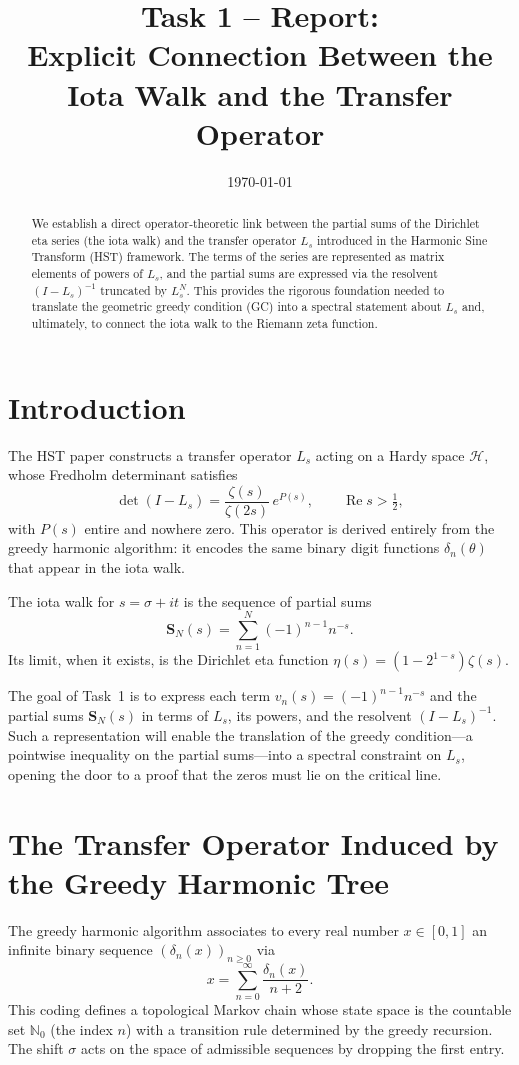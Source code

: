 \documentclass[11pt,a4paper]{article}
\title{\bf Task 1 -- Report: \\
Explicit Connection Between the Iota Walk and the Transfer Operator}
\author{}
\date{\today}
\newcommand{\N}{\mathbb{N}}
\newcommand{\RE}{\operatorname{Re}}
\begin{document}
\maketitle

\begin{abstract}
We establish a direct operator‑theoretic link between the partial sums of the Dirichlet eta series (the iota walk) and the transfer operator $L_s$ introduced in the Harmonic Sine Transform (HST) framework.  The terms of the series are represented as matrix elements of powers of $L_s$, and the partial sums are expressed via the resolvent $(I-L_s)^{-1}$ truncated by $L_s^N$.  This provides the rigorous foundation needed to translate the geometric greedy condition (GC) into a spectral statement about $L_s$ and, ultimately, to connect the iota walk to the Riemann zeta function.
\end{abstract}

\section{Introduction}
The HST paper \cite{HST} constructs a transfer operator $L_s$ acting on a Hardy space $\mathcal{H}$, whose Fredholm determinant satisfies
\[
\det(I - L_s) = \frac{\zeta(s)}{\zeta(2s)}\, e^{P(s)}, \qquad \RE s > \tfrac12,
\tag{1}
\]
with $P(s)$ entire and nowhere zero.  This operator is derived entirely from the greedy harmonic algorithm: it encodes the same binary digit functions $\delta_n(\theta)$ that appear in the iota walk.

The iota walk for $s = \sigma + it$ is the sequence of partial sums
\[
\mathbf{S}_N(s) = \sum_{n=1}^{N} (-1)^{n-1} n^{-s}.
\]
Its limit, when it exists, is the Dirichlet eta function $\eta(s) = (1-2^{1-s})\zeta(s)$.

The goal of Task~1 is to express each term $v_n(s) = (-1)^{n-1} n^{-s}$ and the partial sums $\mathbf{S}_N(s)$ in terms of $L_s$, its powers, and the resolvent $(I-L_s)^{-1}$.  Such a representation will enable the translation of the greedy condition—a pointwise inequality on the partial sums—into a spectral constraint on $L_s$, opening the door to a proof that the zeros must lie on the critical line.

\section{The Transfer Operator Induced by the Greedy Harmonic Tree}
The greedy harmonic algorithm associates to every real number $x\in[0,1]$ an infinite binary sequence $(\delta_n(x))_{n\ge 0}$ via
\[
x = \sum_{n=0}^{\infty} \frac{\delta_n(x)}{n+2}.
\]
This coding defines a topological Markov chain whose state space is the countable set $\N_0$ (the index $n$) with a transition rule determined by the greedy recursion.  The shift $\sigma$ acts on the space of admissible sequences by dropping the first entry.
\end{document}
